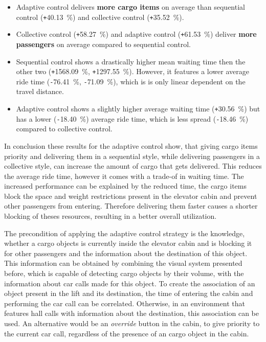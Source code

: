 \begin{itemize}
    \item Adaptive control delivers \textbf{more cargo items} on average than sequential control (\texttt{+}40.13~\%) and collective control (\texttt{+}35.52~\%).
    \item Collective control (\texttt{+}58.27~\%) and adaptive control (\texttt{+}61.53~\%) deliver \textbf{more passengers} on average compared to sequential control. 
    \item Sequential control shows a drastically higher mean waiting time then the other two (\texttt{+}1568.09~\%, \texttt{+}1297.55~\%). However, it features a lower average ride time (\texttt{-}76.41~\%, \texttt{-}71.09~\%), which is is only linear dependent on the travel distance.
    \item Adaptive control shows a slightly higher average waiting time (\texttt{+}30.56~\%) but has a lower (\texttt{-}18.40~\%) average ride time, which is less spread (\texttt{-}18.46~\%) compared to collective control.
\end{itemize}

In conclusion these results for the adaptive control show, that giving cargo items priority and delivering them in a sequential style, while delivering passengers in a collective style, 
can increase the amount of cargo that gets delivered. 
This reduces the average ride time, however it comes with a trade-of in waiting time.
The increased performance can be explained by the reduced time, the cargo items block the space and weight restrictions present in the elevator cabin and prevent other passengers from entering.
Therefore delivering them faster causes a shorter blocking of theses resources, resulting in a better overall utilization.

The precondition of applying the adaptive control strategy is the knowledge, 
whether a cargo objects is currently inside the elevator cabin and is blocking it for other passengers 
and the information about the destination of this object.
This information can be obtained by combining the visual system presented before, which is capable of detecting cargo objects by their volume, with the information about car calls made for this object. To create the association of an object present in the lift and its destination, 
the time of entering the cabin and performing the car call can be correlated.
Otherwise, in an environment that features hall calls with information about the destination, this association can be used.
An alternative would be an \emph{override} button in the cabin, 
to give priority to the current car call, regardless of the presence of an cargo object in the cabin.

